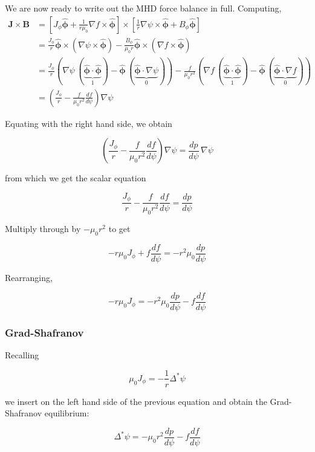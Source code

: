 \documentclass[11pt,a4paper]{article}
\begin{document}
    We are now ready to write out the MHD force balance in full. Computing,
    $$\begin{aligned}
    \mathbf{J}\times\mathbf{B}&=\left[J_\phi \hat{\boldsymbol{\phi}}+\frac{1}{r\mu_0}\nabla f\times\hat{\boldsymbol{\phi}} \right] \times \left[\frac{1}{r} \nabla\psi\times\hat{\boldsymbol{\phi}}+B_\phi \hat{\boldsymbol{\phi}}\right] \\
    &=\frac{J_\phi}{r}\hat{\boldsymbol{\phi}}\times(\nabla\psi\times\hat{\boldsymbol{\phi}}) - \frac{B_\phi}{\mu_0 r}\hat{\boldsymbol{\phi}}\times(\nabla f \times \hat{\boldsymbol{\phi}}) \\
    &= \frac{J_\phi}{r}(\nabla\psi \,(\underbrace{\hat{\boldsymbol{\phi}} \cdot \hat{\boldsymbol{\phi}}}_{1})-\hat{\boldsymbol{\phi}}\,(\underbrace{\hat{\boldsymbol{\phi}} \cdot\nabla\psi}_{0}))-\frac{f}{\mu_0 r^2}(\nabla f\,(\underbrace{\hat{\boldsymbol{\phi}}\cdot\hat{\boldsymbol{\phi}}}_{1})-\hat{\boldsymbol{\phi}}\,(\underbrace{\hat{\boldsymbol{\phi}}\cdot\nabla f}_0)) \\
    &= \left(\frac{J_\phi}{r}-\frac{f}{\mu_0 r^2}\frac{d f}{d\psi}\right)\nabla\psi
    \end{aligned}$$

    Equating with the right hand side, we obtain

    $$\left(\frac{J_\phi}{r}-\frac{f}{\mu_0 r^2}\frac{d f}{d\psi}\right)\nabla\psi=\frac{dp}{d\psi}\,\nabla\psi$$

    from which we get the scalar equation 

    $$\frac{J_\phi}{r}-\frac{f}{\mu_0 r^2}\frac{d f}{d\psi}=\frac{dp}{d\psi}$$

    Multiply through by $-\mu_0r^2$ to get

    $$-r\mu_0J_\phi+f\frac{df}{d\psi}=-r^2\mu_0\frac{dp}{d\psi}$$

    Rearranging,

    $$-r\mu_0J_\phi=-r^2\mu_0\frac{dp}{d\psi}-f\frac{df}{d\psi}$$

    \subsubsection{Grad-Shafranov}
    
    Recalling 

    $$\mu_0J_\phi=-\frac{1}{r}\Delta^*\psi$$

    we insert on the left hand side of the previous equation and obtain the Grad-Shafranov equilibrium:

    $$\boxed{\Delta^*\psi=-\mu_0r^2\frac{dp}{d\psi}-f\frac{df}{d\psi}}$$
\end{document}
